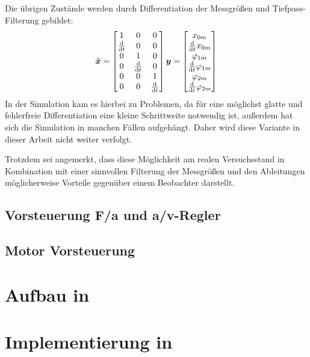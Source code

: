 Die übrigen Zustände werden durch Differentiation der Messgrößen und \evtl Tiefpass-Filterung gebildet:
\begin{align}
	\hat{\boldsymbol{x}}=\begin{bmatrix}
		1	&	0	&	0	\\
		\frac{\mathrm{d}}{\mathrm{d} t}	&	0	&	0	\\
		0	&	1	&	0	\\
		0	&	\frac{\mathrm{d}}{\mathrm{d} t}	&	0	\\
		0	&	0	&	1	\\
		0	&	0	&	\frac{\mathrm{d}}{\mathrm{d} t}	\\
	\end{bmatrix} \boldsymbol{y}  = \begin{bmatrix}
		x_{0m} \\ \frac{\mathrm{d}}{\mathrm{d} t} x_{0m} \\ \varphi_{1m} \\ \frac{\mathrm{d}}{\mathrm{d} t} \varphi_{1m} \\ \varphi_{2m} \\ \frac{\mathrm{d}}{\mathrm{d} t} \varphi_{2m}
	\end{bmatrix}
\end{align}
In der Simulation kam es hierbei zu Problemen, da für eine möglichst glatte und fehlerfreie Differentiation eine kleine Schrittweite notwendig ist, außerdem hat sich die Simulation in manchen Fällen aufgehängt. Daher wird diese Variante in dieser Arbeit nicht weiter verfolgt.

Trotzdem sei angemerkt, dass diese Möglichkeit am realen Versuchsstand in Kombination mit einer sinnvollen Filterung der Messgrößen und den Ableitungen möglicherweise Vorteile gegenüber einem Beobachter darstellt. 


\subsection{Vorsteuerung F/a und a/v-Regler}



\subsection{Motor Vorsteuerung}\label{sec:motvorst}






\section{Aufbau in \Simulink}



\section{Implementierung in \Matlab}




